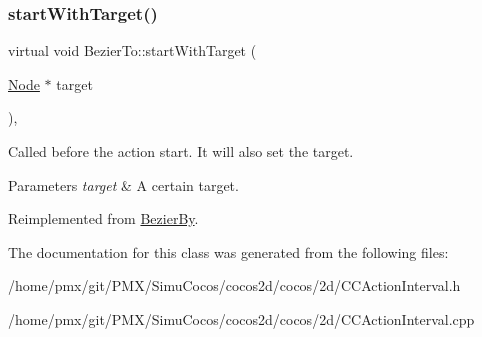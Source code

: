 \mbox{\label{classBezierTo_a0afa7e2b008c5d8f8a63d559face86a3}} 
\subsubsection{\texorpdfstring{start\+With\+Target()}{startWithTarget()}\hspace{0.1cm}{\footnotesize\ttfamily [2/2]}}
{\footnotesize\ttfamily virtual void Bezier\+To\+::start\+With\+Target (\begin{DoxyParamCaption}\item[{\hyperlink{classNode}{Node} $\ast$}]{target }\end{DoxyParamCaption})\hspace{0.3cm}{\ttfamily [override]}, {\ttfamily [virtual]}}

Called before the action start. It will also set the target.


\begin{DoxyParams}{Parameters}
{\em target} & A certain target. \\
\hline
\end{DoxyParams}


Reimplemented from \hyperlink{classBezierBy_a3a68011f000b7f0ad58668b3ec0f7494}{Bezier\+By}.



The documentation for this class was generated from the following files\+:\begin{DoxyCompactItemize}
\item 
/home/pmx/git/\+P\+M\+X/\+Simu\+Cocos/cocos2d/cocos/2d/C\+C\+Action\+Interval.\+h\item 
/home/pmx/git/\+P\+M\+X/\+Simu\+Cocos/cocos2d/cocos/2d/C\+C\+Action\+Interval.\+cpp\end{DoxyCompactItemize}

